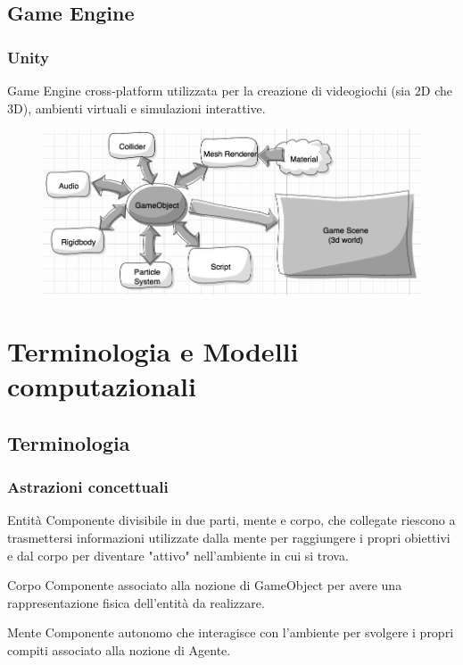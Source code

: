 \documentclass[handout]{beamer}\mode<presentation>{\usetheme{AMSCesenaBleu}}
\begin{document}
\subsection{Game Engine}

\begin{frame}
\frametitle[Stack Tecnologico]{Unity}

Game Engine cross-platform utilizzata per la creazione di videogiochi (sia 2D che 3D), ambienti virtuali e simulazioni interattive.
\begin{figure}
\includegraphics[width=0.8\linewidth]{figures/unity_diagram.png}
\end{figure}

\end{frame}

\section{Terminologia e Modelli computazionali}

\subsection{Terminologia}

\begin{frame}
\frametitle[Stack Tecnologico]{Astrazioni concettuali}

    \begin{block}{Entità}
        Componente divisibile in due parti, mente e corpo, che collegate riescono a trasmettersi informazioni utilizzate dalla mente per raggiungere i propri obiettivi e dal corpo per diventare "attivo" nell’ambiente in cui si trova.
    \end{block}

    \begin{exampleblock}{Corpo}
        Componente associato alla nozione di GameObject per avere una rappresentazione fisica dell’entità da realizzare.
    \end{exampleblock}

    \begin{exampleblock}{Mente}
        Componente autonomo che interagisce con l’ambiente per svolgere i propri compiti associato alla nozione di Agente.
    \end{exampleblock}

\end{frame}
\end{document}
